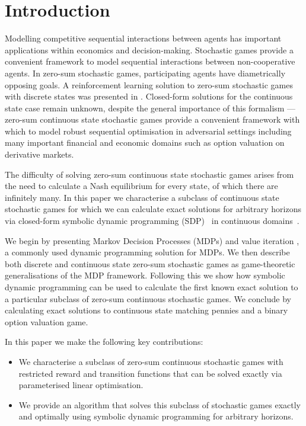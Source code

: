 \section{Introduction}

Modelling competitive sequential interactions between agents has
important applications within economics and decision-making.
Stochastic games \cite{Shapley_PotNAoS_1953} provide a convenient
framework to model sequential interactions between non-cooperative
agents. In zero-sum stochastic games, participating agents have
diametrically opposing goals. A reinforcement learning solution to
zero-sum stochastic games with discrete states was presented in
\cite{Littman_ICML_1994}.  Closed-form solutions for the continuous
state case remain unknown, despite the general importance of this
formalism --- zero-sum continuous state stochastic games provide a
convenient framework with which to model robust sequential
optimisation in adversarial settings including many important
financial and economic domains such as option valuation on derivative
markets.

The difficulty of solving zero-sum continuous state stochastic games
arises from the need to calculate a Nash equilibrium for every state,
of which there are infinitely many. In this paper we characterise a
subclass of continuous state stochastic games for which we can
calculate exact solutions for arbitrary horizons 
via closed-form symbolic dynamic programming
(SDP)~\cite{Boutilier_IJCAI_2001} in 
continuous domains~\cite{Sanner_UAI_2011,Zamani_AAAI_2012}.

We begin by presenting Markov Decision Processes (MDPs) \cite{Howard_1960} 
and value iteration \cite{Bellman_1957}, a commonly used dynamic programming
solution for MDPs. We then describe both discrete and continuous state 
zero-sum stochastic games as game-theoretic generalisations of the MDP framework. 
Following this we show how symbolic dynamic programming
can be used to calculate the first known exact solution to a particular subclass of 
zero-sum continuous stochastic games. We conclude by calculating
exact solutions to continuous state matching pennies and a binary
option valuation game.

In this paper we make the following key contributions:
\begin{itemize}
  \item We characterise a subclass of zero-sum continuous stochastic
    games with restricted reward and transition functions that can be
    solved exactly via parameterised linear optimisation.
  \item We provide an algorithm that solves this subclass of
    stochastic games exactly and optimally using symbolic dynamic
    programming for arbitrary horizons.
\end{itemize}

